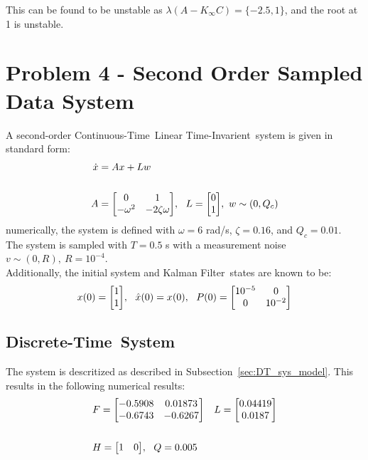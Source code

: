 \documentclass[]{article}
\newcommand{\KF}{Kalman Filter}
\newcommand{\CT}{Continuous-Time}
\newcommand{\DT}{Discrete-Time}
\newcommand{\LTI}{Linear Time-Invarient}
\newcommand{\subsectionname}{Subsection}
\begin{document}
		This can be found to be unstable as $\lambda(A - K_\infty C) = \{-2.5,1\}$, and the root at 1 is unstable.
	
\newpage
\section{Problem 4 - Second Order Sampled Data System}
	A second-order \CT \ \LTI \ system is given in standard form:
	\begin{equation}
		\begin{aligned}
			\dot{x} &= A x + L w\\
			\\
			A &= \mqty[0 & 1\\ -\omega^2 &-2\zeta\omega], \ \ L = \mqty[0\\1], \ w \sim (0,Q_c)
		\end{aligned}
	\end{equation}
	numerically, the system is defined with $\omega = 6$ rad/s, $\zeta = 0.16$, and $Q_c = 0.01$.\\
	
	The system is sampled with $T = 0.5$ s with a measurement noise $v \sim (0,R), \ R = 10^{-4}$.\\
	Additionally, the initial system and \KF \ states are known to be:
	\begin{equation}
		x(0) = \mqty[1\\1], \ \ \hat{x}(0) = x(0), \ \ P(0) = \mqty[\dmat[0]{10^{-5},10^{-2}}]
	\end{equation}
	
	\subsection{\DT \ System}
		The system is descritized as described in \subsectionname \ \ref{sec:DT_sys_model}. This results in the following numerical results:
		\begin{equation}
			\begin{aligned}
				&F = \mqty[-0.5908 &0.01873\\ -0.6743 &-0.6267] \ \ \ L = \mqty[0.04419\\ 0.0187]\\
				\\
				&H = \mqty[1 &0], \ \ Q = 0.005
			\end{aligned}
		\end{equation}
	
\end{document}

